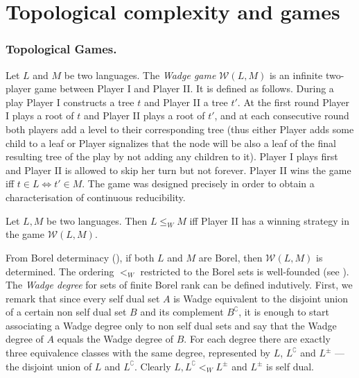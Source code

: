 \section{Topological complexity and games}\label{section:games}
\subsubsection*{Topological Games.}
Let $L$ and $M$ be two languages. The {\em Wadge game}
$\mathcal{W}(L, M)$ is an infinite two-player game between Player I and Player II. It is defined as follows. During a play Player I constructs a tree $t$ and Player II a tree $t'$. At the first round Player I plays a root of $t$ and Player II plays a root of $t'$, and at each consecutive round both players add a level
to their corresponding tree (thus either Player adds some child to a leaf or Player signalizes that the node will be also a leaf of the final resulting tree of the play by not adding any children to it).
Player I plays first and Player II is allowed to
skip her turn but not forever.  Player II wins the game iff $t \in L
\Leftrightarrow t' \in M$.  
The game was designed precisely in order to obtain a characterisation of continuous reducibility.
\begin{lemma}\label{lemma:wadge}
Let $L, M$ be two languages. Then  $L \leq_W M$ iff Player II has a winning strategy in the game $\mathcal{W}(L, M)$.
\end{lemma}
From Borel determinacy (\cite{martin}),
if both $L$ and $M$ are Borel, then $\mathcal{W}(L, M)$ is determined.
The ordering $<_W$ restricted to the Borel sets is
well-founded (see \cite[Theorem 21.15]{kechris}). The \emph{Wadge degree} for sets of finite Borel rank can
be %
defined indutively. First, we remark that since every self dual set $A$ is Wadge equivalent to the disjoint union of a certain non self dual set $B$ and its complement $B^\complement$, it is enough to start associating a Wadge degree only to non self dual sets and say that the Wadge degree of $A$ equals the Wadge degree of $B$. 
For each degree there are exactly three equivalence
classes with the same degree, represented by $L$, $L^\complement$ and
$L^\pm$ --- the disjoint union of $L$ and $L^\complement$. %
Clearly $L, L^\complement <_W L^\pm$ and
$L^\pm$ is self dual.

